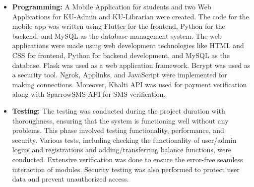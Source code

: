 \documentclass[a4paper,14pt]{article}
\begin{document}
{{{{{{{{{{\begin{itemize}
				\vspace{1.5cm} 
				\newpage
				\noindent \textbf{Workflow Diagrams:}
				
				\begin{figure}[h!]
					\centering
					\texttt{[image: adminworkflow.png]}
					\caption{Admin Workflow Diagram}
					\label{fig:admin-workflow}
				\end{figure}
				\newpage
				\begin{figure}[h!]
					\centering
					\texttt{[image: studentworkflow.png]}
					\caption{Student Workflow Diagram}
					\label{fig:student-workflow}
				\end{figure}
				
					\newpage
				\noindent \textbf{Activity Diagrams:}
					\begin{figure}[h!]
					\centering
					\texttt{[image: ActivityDiagram.png]}
					\caption{Activity Diagram}
					\label{fig:Activity Diagram}
				\end{figure}
				
					\newpage
				\noindent \textbf{ER Diagrams:}
				\begin{figure}[h!]
					\centering
					\texttt{[image: ERDiagram.png]}
					\caption{ER Diagram}
					\label{fig:ER Diagram}
				\end{figure}
			
				
				\item \textbf{Programming:} A Mobile Application for students and two Web Applications for KU-Admin and KU-Librarian were created. The code for the mobile app was written using Flutter for the frontend, Python for the backend, and MySQL as the database management system. The web applications were made using web development technologies like HTML and CSS for frontend, Python for backend development, and MySQL as the database. Flask was used as a web application framework. Bcrypt was used as a security tool. Ngrok, Applinks, and JavaScript were implemented for making connections. Moreover, Khalti API was used for payment verification along with SparrowSMS API for SMS verification.
				
				\item \textbf{Testing:} The testing was conducted during the project duration with thoroughness, ensuring that the system is functioning well without any problems. This phase involved testing functionality, performance, and security. Various tests, including checking the functionality of user/admin logins and registrations and adding/transferring balance functions, were conducted. Extensive verification was done to ensure the error-free seamless interaction of modules. Security testing was also performed to protect user data and prevent unauthorized access.
			\end{itemize}
			
}}}}}}}}}}
\end{document}
